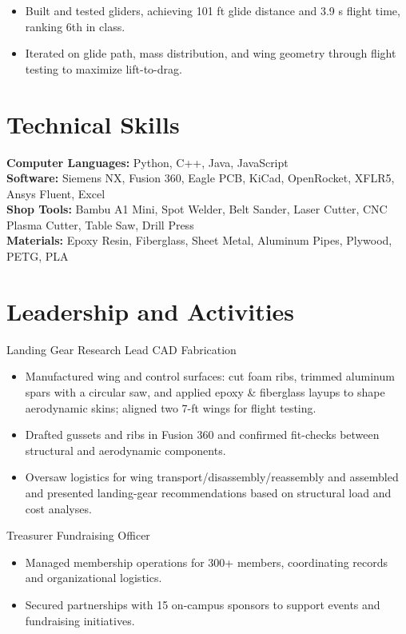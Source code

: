 \begin{itemize}
  \item Built and tested gliders, achieving 101 ft glide distance and 3.9 s flight time, ranking 6th in class.
  \item Iterated on glide path, mass distribution, and wing geometry through flight testing to maximize lift-to-drag.
\end{itemize}

\section{Technical Skills}
\textbf{Computer Languages:} Python, C++, Java, JavaScript\\
\textbf{Software:} Siemens NX, Fusion 360, Eagle PCB, KiCad, OpenRocket, XFLR5, Ansys Fluent, Excel\\
\textbf{Shop Tools:} Bambu A1 Mini, Spot Welder, Belt Sander, Laser Cutter, CNC Plasma Cutter, Table Saw, Drill Press\\
\textbf{Materials:} Epoxy Resin, Fiberglass, Sheet Metal, Aluminum Pipes, Plywood, PETG, PLA

\section{Leadership and Activities}

Landing Gear Research Lead \textbar{} CAD \textbar{} Fabrication
\begin{itemize}
  \item Manufactured wing and control surfaces: cut foam ribs, trimmed aluminum spars with a circular saw, and applied epoxy \& fiberglass layups to shape aerodynamic skins; aligned two 7-ft wings for flight testing.
  \item Drafted gussets and ribs in Fusion 360 and confirmed fit-checks between structural and aerodynamic components.
  \item Oversaw logistics for wing transport/disassembly/reassembly and assembled and presented landing-gear recommendations based on structural load and cost analyses.
\end{itemize}
\entrygap

Treasurer \textbar{} Fundraising Officer
\begin{itemize}
  \item Managed membership operations for 300+ members, coordinating records and organizational logistics.
  \item Secured partnerships with 15 on-campus sponsors to support events and fundraising initiatives.
\end{itemize}


